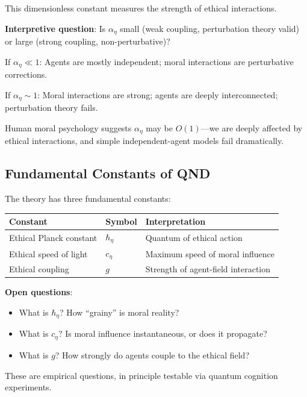\documentclass[12pt]{article}
\begin{document}
This dimensionless constant measures the strength of ethical interactions.

\textbf{Interpretive question}: Is $\alpha_\eta$ small (weak coupling, perturbation theory valid) or large (strong coupling, non-perturbative)?

If $\alpha_\eta \ll 1$: Agents are mostly independent; moral interactions are perturbative corrections.

If $\alpha_\eta \sim 1$: Moral interactions are strong; agents are deeply interconnected; perturbation theory fails.

Human moral psychology suggests $\alpha_\eta$ may be $O(1)$---we are deeply affected by ethical interactions, and simple independent-agent models fail dramatically.

\subsection{Fundamental Constants of QND}

The theory has three fundamental constants:

\begin{table}[h]
\centering
\begin{tabular}{lll}
\toprule
\textbf{Constant} & \textbf{Symbol} & \textbf{Interpretation} \\
\midrule
Ethical Planck constant & $\hbar_\eta$ & Quantum of ethical action \\
Ethical speed of light & $c_\eta$ & Maximum speed of moral influence \\
Ethical coupling & $g$ & Strength of agent-field interaction \\
\bottomrule
\end{tabular}
\end{table}

\textbf{Open questions}:

\begin{itemize}
    \item What is $\hbar_\eta$? How ``grainy'' is moral reality?
    \item What is $c_\eta$? Is moral influence instantaneous, or does it propagate?
    \item What is $g$? How strongly do agents couple to the ethical field?
\end{itemize}

These are empirical questions, in principle testable via quantum cognition experiments.

\end{document}
